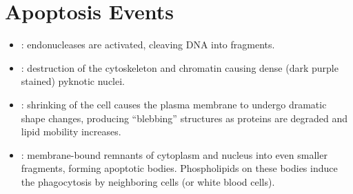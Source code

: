 \section{Apoptosis Events}\label{Apoptosis Events}
\begin{itemize}
  \item {}: endonucleases are activated, cleaving DNA into fragments. 
  \begin{center}
    \Arrow
  \end{center}
  \item {}: destruction of the cytoskeleton and chromatin causing dense (dark purple stained) pyknotic nuclei. 
  \begin{center}
    \Arrow
  \end{center}
  \item {}: shrinking of the cell causes the plasma membrane to undergo dramatic shape changes, producing ``blebbing'' structures as proteins are degraded and lipid mobility increases.
  \begin{center}
    \Arrow
    \Arrow
  \end{center}
  \item {}: membrane-bound remnants of cytoplasm and nucleus into even smaller fragments, forming apoptotic bodies. Phospholipids on these bodies induce the phagocytosis by neighboring cells (or white blood cells).
  \begin{center}
    \Arrow
  \end{center}
\end{itemize}

\newpage

